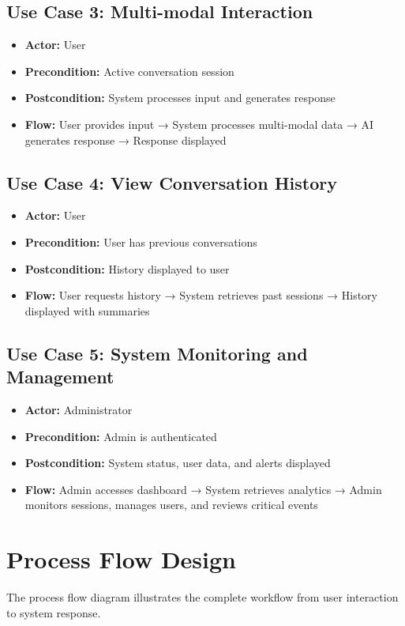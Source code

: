 \documentclass[11pt]{report}
\begin{document}
\subsection{Use Case 3: Multi-modal Interaction}
\begin{itemize}
    \item \textbf{Actor:} User
    \item \textbf{Precondition:} Active conversation session
    \item \textbf{Postcondition:} System processes input and generates response
    \item \textbf{Flow:} User provides input → System processes multi-modal data → AI generates response → Response displayed
\end{itemize}

\subsection{Use Case 4: View Conversation History}
\begin{itemize}
    \item \textbf{Actor:} User
    \item \textbf{Precondition:} User has previous conversations
    \item \textbf{Postcondition:} History displayed to user
    \item \textbf{Flow:} User requests history → System retrieves past sessions → History displayed with summaries
\end{itemize}

\subsection{Use Case 5: System Monitoring and Management}
\begin{itemize}
    \item \textbf{Actor:} Administrator
    \item \textbf{Precondition:} Admin is authenticated
    \item \textbf{Postcondition:} System status, user data, and alerts displayed
    \item \textbf{Flow:} Admin accesses dashboard → System retrieves analytics → Admin monitors sessions, manages users, and reviews critical events
\end{itemize}
\newpage
\section{Process Flow Design}
The process flow diagram illustrates the complete workflow from user interaction to system response.
\end{document}

